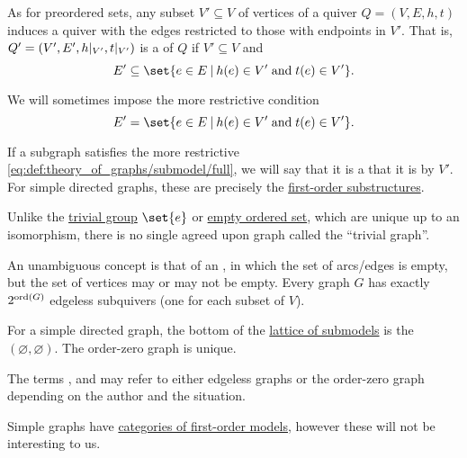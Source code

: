 \begin{definition}
\begin{thmenum}
     As for preordered sets, any subset \( V' \subseteq V \) of vertices of a quiver \( Q = (V, E, h, t) \) induces a quiver with the edges restricted to those with endpoints in \( V' \). That is, \( Q' = (V', E', h\vert_{V'}, t\vert_{V'}) \) is a  of \( Q \) if \( V' \subseteq V \) and
    \begin{equation}\label{eq:def:theory_of_graphs/submodel}
      E' \subseteq \set{ e \in E \given h(e) \in V' \T{and} t(e) \in V' }.
    \end{equation}

    We will sometimes impose the more restrictive condition
    \begin{equation}\label{eq:def:theory_of_graphs/submodel/full}
      E' = \set{ e \in E \given h(e) \in V' \T{and} t(e) \in V' }.
    \end{equation}

    If a subgraph satisfies the more restrictive \eqref{eq:def:theory_of_graphs/submodel/full}, we will say that it is a  that it is  by \( V' \). For simple directed graphs, these are precisely the \hyperref[def:first_order_substructure]{first-order substructures}.

     Unlike the \hyperref[def:group/trivial]{trivial group} \( \set{ e } \) or \hyperref[def:partially_ordered_set/trivial]{empty ordered set}, which are unique up to an isomorphism, there is no single agreed upon graph called the \enquote{trivial graph}.

    An unambiguous concept is that of an , in which the set of arcs/edges is empty, but the set of vertices may or may not be empty. Every graph \( G \) has exactly \( 2^{\operatorname{ord}(G)} \) edgeless subquivers (one for each subset of \( V \)).

    For a simple directed graph, the bottom of the \hyperref[thm:substructures_form_complete_lattice]{lattice of submodels} is the  \( (\varnothing, \varnothing) \). The order-zero graph is unique.

    The terms ,  and  may refer to either edgeless graphs or the order-zero graph depending on the author and the situation.

     Simple graphs have \hyperref[def:category_of_first_order_models]{categories of first-order models}, however these will not be interesting to us.


\end{thmenum}
\end{definition}
